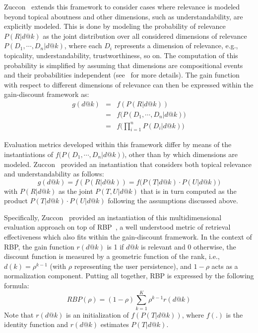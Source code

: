 Zuccon~\cite{zuccon16} extends this framework to consider cases where relevance is modeled beyond topical aboutness and other dimensions, such as understandability, are explicitly modeled.
This is done by modeling the probability of relevance $P(R|d@k)$ as the joint distribution over all considered dimensions of relevance $P(D_1, \cdots, D_n|d@k)$, where  each $D_i$ represents a dimension of relevance, e.g., topicality, understandability, trustworthiness, so on. The computation of this probability is simplified by assuming  that dimensions are compositional events and their probabilities independent (see~\cite{zuccon16} for more details). The gain function with respect to different dimensions of relevance can then be expressed within the gain-discount framework as:
%
\begin{eqnarray}
    g(d@k) &=& f(P(R|d@k)) \\
    &=& f\big(P(D_1, \cdots, D_n|d@k)\big) \\
    &=& f\Big(\prod_{i=1}^n P(D_i|d@k)\Big) 
\end{eqnarray}
%

Evaluation metrics developed within this framework differ by means of the instantiations of $f\big(P(D_1, \cdots, D_n|d@k)\big)$, other than by which dimensions are modeled. Zuccon~\cite{zuccon16} provided an instantiation that considers both topical relevance and understandability as follows:
%
\begin{equation}
g(d@k) = f(P(R|d@k)) = f\big(P(T|d@k) \cdot P(U|d@k)\big)
\end{equation}
%
with $P(R|d@k)$ as the joint $P(T,U|d@k)$ that is in turn computed as the product $P(T|d@k) \cdot P(U|d@k)$ following the assumptions discussed above.

Specifically, Zuccon~\cite{zuccon16} provided an instantiation of this multidimensional evaluation approach on top of RBP~\cite{moffat08}, a well understood metric of retrieval effectiveness which also fits within the gain-discount framework. 
In the context of RBP, the gain function $r(d@k)$ is 1 if $d@k$ is relevant and 0 otherwise, the discount function is measured by a geometric function of the rank, i.e., $d(k) = \rho^{k-1}$ (with $\rho$ representing the user persistence), and $1-\rho$ acts as a normalization component. Putting all together, RBP is expressed by the following formula:
\begin{equation}
    RBP(\rho) = (1-\rho) \sum_{k=1}^{K} \rho^{k-1} r(d@k)
\label{eq:RBP}
\end{equation}
%
Note that $r(d@k)$ is an initialization of $f(P(T|d@k))$, where $f(.)$ is the identity function and $r(d@k)$ estimates $P(T|d@k)$. 

